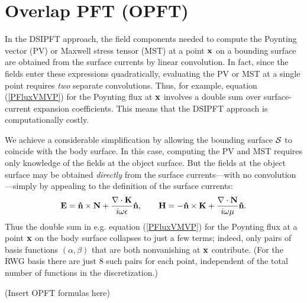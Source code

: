 \newpage
\section{Overlap PFT (OPFT)}

In the DSIPFT approach, the field components needed to compute
the Poynting vector (PV) or Maxwell stress tensor (MST) at a point
$\mathbf{x}$ on a bounding surface are obtained from the surface
currents by linear convolution. In fact, since the fields 
enter these expressions quadratically, evaluating the PV
or MST at a single point requires \textit{two} separate 
convolutions. Thus, for example, equation
(\ref{PFluxVMVP}) for the Poynting flux at $\mathbf{x}$ involves
a double sum over surface-current expansion coefficients.
This means that the DSIPFT approach is computationally
costly.

We achieve a considerable simplification by allowing the 
bounding surface $\mathcal{S}$ to coincide with the body surface.
In this case, computing the PV and MST requires only 
knowledge of the fields at the object surface.
But the fields at the object surface may be obtained
\textit{directly} from the surface currents---with no
convolution---simply by appealing to the definition
of the surface currents:
$$
 \mathbf{E} = \mathbf{\hat n} \times \mathbf{N} 
         + \frac{\nabla\cdot\mathbf{K}}{i\omega \epsilon}\mathbf{\hat n}, 
\qquad
 \mathbf{H} = -\mathbf{\hat n} \times \mathbf{K}
         + \frac{\nabla\cdot\mathbf{N}}{i\omega \mu}\mathbf{\hat n}.
$$
Thus the double sum in e.g. equation (\ref{PFluxVMVP}) for the Poynting 
flux at a point $\mathbf{x}$ on the body surface collapses to just a 
few terms; indeed, only pairs of basis functions $(\alpha,\beta)$
that are both nonvanishing at $\mathbf{x}$ contribute.
(For the RWG basis there are just 8 such pairs for each point,
independent of the total number of functions in the discretization.)

(Insert OPFT formulas here)
